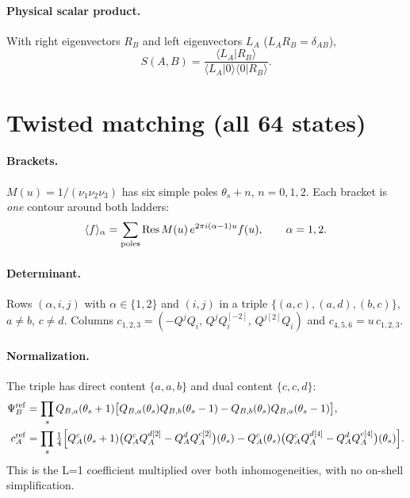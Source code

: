 \documentclass[11pt]{article}
\begin{document}
\paragraph{Physical scalar product.} With right eigenvectors $R_B$ and left eigenvectors $L_A$ ($L_AR_B=\delta_{AB}$),
\begin{equation}
S(A,B)=\frac{\langle L_A|R_B\rangle}{\langle L_A|0\rangle\langle0|R_B\rangle}.
\end{equation}

\section{Twisted matching (all 64 states)}

\paragraph{Brackets.} $M(u)=1/(\nu_1\nu_2\nu_3)$ has six simple poles $\theta_s+n$, $n=0,1,2$. Each bracket is \emph{one} contour around both ladders:
\begin{equation}
\langle f\rangle_\alpha=\sum_{\rm poles}\operatorname{Res}M(u)\,e^{2\pi i(\alpha-1)u}f(u),\qquad\alpha=1,2.
\end{equation}

\paragraph{Determinant.} Rows $(\alpha,i,j)$ with $\alpha\in\{1,2\}$ and $(i,j)$ in a triple $\{(a,c),(a,d),(b,c)\}$, $a\neq b$, $c\neq d$.
Columns $c_{1,2,3}=(-Q^jQ_i,\,Q^jQ_i^{[-2]},\,Q^{j[2]}Q_i)$ and $c_{4,5,6}=u\,c_{1,2,3}$.

\paragraph{Normalization.} The triple has direct content $\{a,a,b\}$ and dual content $\{c,c,d\}$:
\begin{align}
\Psi^{\rm ref}_B&=\prod_s Q_{B,a}(\theta_s+1)\big[Q_{B,a}(\theta_s)Q_{B,b}(\theta_s-1)-Q_{B,b}(\theta_s)Q_{B,a}(\theta_s-1)\big],\\
c^{\rm ref}_A&=\prod_s\tfrac14\Big[Q^c_A(\theta_s+1)\big(Q^c_AQ^{d[2]}_A-Q^d_AQ^{c[2]}_A\big)(\theta_s)
-Q^c_A(\theta_s)\big(Q^c_AQ^{d[4]}_A-Q^d_AQ^{c[4]}_A\big)(\theta_s)\Big].
\end{align}
This is the L=1 coefficient multiplied over both inhomogeneities, with no on-shell simplification.
\end{document}

